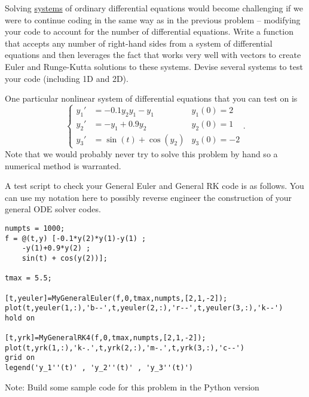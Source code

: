 \begin{problem}
    Solving \underline{systems} of ordinary differential equations would become challenging if we were
    to continue coding in the same way as in the previous problem -- modifying your code
    to account for the number of differential equations. Write a \ProgLang function
    that accepts any number of right-hand sides from a system of differential equations
    and then leverages the fact that \ProgLang works very well with vectors to create Euler
    and Runge-Kutta solutions to these systems. Devise several systems to test your code
    (including 1D and 2D).

    One particular nonlinear system of differential equations that you can test on is
    \[ \left\{ \begin{array}{rlc} y_1' &= -0.1y_2 y_1 - y_1 & y_1(0) = 2 \\
            y_2' &= -y_1 + 0.9y_2 & y_2(0) = 1 \\
        y_3' &= \sin(t)+ \cos(y_2) & y_3(0)=-2 \end{array} \right.. \]
    Note that we would probably never try to solve this problem by hand so a numerical
    method is warranted.

    A test script to check your General Euler and General RK code is as follows.  You can
    use my notation here to possibly reverse engineer the construction of your general ODE
    solver codes.

    \bcode
\begin{lstlisting}
numpts = 1000;
f = @(t,y) [-0.1*y(2)*y(1)-y(1) ; 
    -y(1)+0.9*y(2) ; 
    sin(t) + cos(y(2))];

tmax = 5.5;

[t,yeuler]=MyGeneralEuler(f,0,tmax,numpts,[2,1,-2]);
plot(t,yeuler(1,:),'b--',t,yeuler(2,:),'r--',t,yeuler(3,:),'k--')
hold on

[t,yrk]=MyGeneralRK4(f,0,tmax,numpts,[2,1,-2]);
plot(t,yrk(1,:),'k-.',t,yrk(2,:),'m-.',t,yrk(3,:),'c--')
grid on
legend('y_1''(t)' , 'y_2''(t)' , 'y_3''(t)')
\end{lstlisting}
    \ifnum{}
{\color{red} Note: Build some sample code for this problem in the Python version}
\fi
\end{problem}




